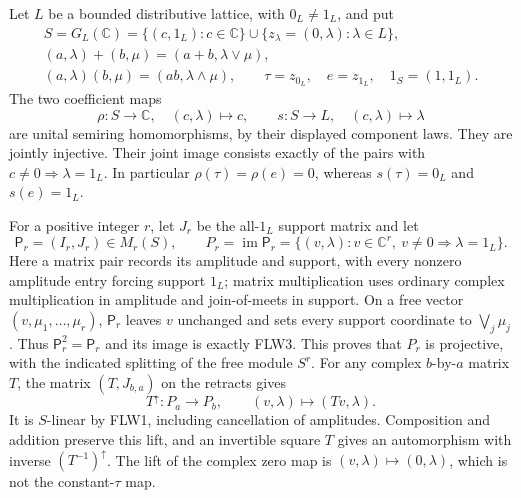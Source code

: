 Let $L$ be a bounded distributive lattice, with $0_L\ne1_L$, and put
\[
\begin{gathered}
 S=G_L(\mathbb C)
   =\{(c,1_L):c\in\mathbb C\}\cup\{z_\lambda=(0,\lambda):\lambda\in L\},\\
 (a,\lambda)+(b,\mu)=(a+b,\lambda\vee\mu),\\
 (a,\lambda)(b,\mu)=(ab,\lambda\wedge\mu),\qquad
 \tau=z_{0_L},\quad e=z_{1_L},\quad1_S=(1,1_L).
\end{gathered}
\tag{FLW1}
\]
The two coefficient maps
\[
 \rho:S\longrightarrow\mathbb C,\quad(c,\lambda)\longmapsto c,
 \qquad
 s:S\longrightarrow L,\quad(c,\lambda)\longmapsto\lambda
 \tag{FLW2}
\]
are unital semiring homomorphisms, by their displayed component
laws. They are jointly injective. Their joint image consists exactly
of the pairs with $c\ne0\Rightarrow\lambda=1_L$.
In particular $\rho(\tau)=\rho(e)=0$, whereas
$s(\tau)=0_L$ and $s(e)=1_L$.

For a positive integer $r$, let $J_r$ be the all-$1_L$ support
matrix and let
\[
 \mathsf P_r=(I_r,J_r)\in M_r(S),\qquad
 P_r=\operatorname{im}\mathsf P_r
 =\{(v,\lambda):v\in\mathbb C^r,\ 
                       v\ne0\Rightarrow\lambda=1_L\}.
 \tag{FLW3}
\]
Here a matrix pair records its amplitude and support, with every
nonzero amplitude entry forcing support $1_L$; matrix multiplication
uses ordinary complex multiplication in amplitude and join-of-meets
in support. On a free vector $(v,\mu_1,\ldots,\mu_r)$,
$\mathsf P_r$ leaves $v$ unchanged and sets every support coordinate
to $\bigvee_j\mu_j$. Thus $\mathsf P_r^2=\mathsf P_r$ and its
image is exactly FLW3. This proves that $P_r$ is projective, with
the indicated splitting of the free module $S^r$.
For any complex $b$-by-$a$ matrix $T$, the matrix
$(T,J_{b,a})$ on the retracts gives
\[
 T^\uparrow:P_a\longrightarrow P_b,
       \qquad(v,\lambda)\longmapsto(Tv,\lambda).
 \tag{FLW4}
\]
It is $S$-linear by FLW1, including cancellation of amplitudes.
Composition and addition preserve this lift, and an invertible
square $T$ gives an automorphism with inverse $(T^{-1})^\uparrow$.
The lift of the complex zero map is $(v,\lambda)\mapsto(0,\lambda)$,
which is not the constant-$\tau$ map.

